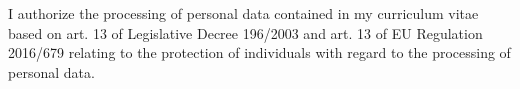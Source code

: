 \documentclass[localFont,alternative,10pt,compact]{cv}
\begin{document}
\makecvheader
\makecvfooter
{}
{\footnotesize{I authorize the processing of personal data contained in my curriculum vitae based on art. 13 of Legislative Decree 196/2003 and art. 13 of EU Regulation 2016/679 relating to the protection of individuals with regard to the processing of personal data.}}
{}







\end{document}
